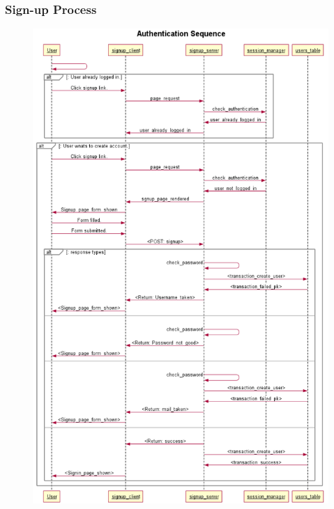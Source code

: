 \subsubsection{Sign-up Process}
\begin{figure}
\centering
\includegraphics[scale=0.70]{signup}
\end{figure}

\newpage
